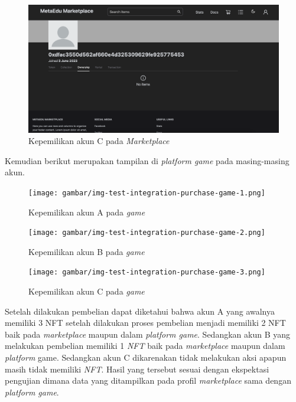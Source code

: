   \begin{figure} [H] \centering
            \includegraphics[scale=0.2]{gambar/img-test-integration-purchase-profile-3.png}
            \caption{Kepemilikan akun C pada \emph{Marketplace}}
            \label{fig:TestIntegrationPurchaseProfile3}
        \end{figure}

Kemudian berikut merupakan tampilan di \emph{platform game} pada masing-masing akun.

\begin{figure} [H] \centering
            \texttt{[image: gambar/img-test-integration-purchase-game-1.png]}
            \caption{Kepemilikan akun A pada \emph{game}}
            \label{fig:TestIntegrationPurchaseGame1}
        \end{figure}

\begin{figure} [H] \centering
            \texttt{[image: gambar/img-test-integration-purchase-game-2.png]}
            \caption{Kepemilikan akun B pada \emph{game}}
            \label{fig:TestIntegrationPurchaseGame2}
        \end{figure}
        
\begin{figure} [H] \centering
            \texttt{[image: gambar/img-test-integration-purchase-game-3.png]}
            \caption{Kepemilikan akun C pada \emph{game}}
            \label{fig:TestIntegrationPurchaseGame3}
        \end{figure}

Setelah dilakukan pembelian dapat diketahui bahwa akun A yang awalnya memiliki 3 NFT setelah dilakukan proses pembelian menjadi memiliki 2 NFT baik pada \emph{marketplace} maupun dalam \emph{platform game}. Sedangkan akun B yang melakukan pembelian memiliki 1 \emph{NFT} baik pada \emph{marketplace} maupun dalam \emph{platform} game. Sedangkan akun C dikarenakan tidak melakukan aksi apapun masih tidak memiliki \emph{NFT}. Hasil yang tersebut sesuai dengan ekspektasi pengujian dimana data yang ditampilkan pada profil \emph{marketplace} sama dengan \emph{platform game}. 

